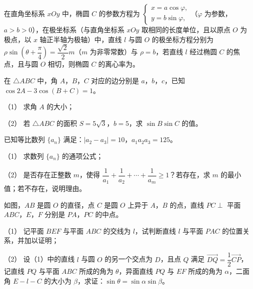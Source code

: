 \begin{question}
在直角坐标系 $xOy$ 中，椭圆 $C$ 的参数方程为 $\begin{cases}x=a\cos\varphi,\\y=b\sin\varphi,\end{cases}$（$\varphi$ 为参数，$a>b>0$），在极坐标系（与直角坐标系 $xOy$ 取相同的长度单位，且以原点 $O$ 为极点，以 $x$ 轴正半轴为极轴）中，直线 $l$ 与圆 $O$ 的极坐标方程分别为 $\rho\sin\left(\theta+\dfrac{\pi}{4}\right)=\dfrac{\sqrt2}{2}m$（$m$ 为非零常数）与 $\rho=b$，若直线 $l$ 经过椭圆 $C$ 的焦点，且与圆 $O$ 相切，则椭圆 $C$ 的离心率为\gkblank{}。

\end{question}

\begin{question}
在 $\triangle ABC$ 中，角 $A$，$B$，$C$ 对应的边分别是 $a$，$b$，$c$，已知 $\cos2A-3\cos(B+C)=1$。

（1） 求角 $A$ 的大小；

（2） 若 $\triangle ABC$ 的面积 $S=5\sqrt3$，$b=5$，求 $\sin B\sin C$ 的值。

\end{question}
\begin{question}
已知等比数列 $\{a_n\}$ 满足：$|a_2-a_3|=10$，$a_1a_2a_3=125$。

（1） 求数列 $\{a_n\}$ 的通项公式；

（2） 是否存在正整数 $m$，使得 $\dfrac{1}{a_1}+\dfrac{1}{a_2}+\cdots+\dfrac{1}{a_m}\geqslant1$？若存在，求 $m$ 的最小值；若不存在，说明理由。

\Needspace{0.4\textheight}
\end{question}
\begin{question}
如图，$AB$ 是圆 $O$ 的直径，点 $C$ 是圆 $O$ 上异于 $A$，$B$ 的点，直线 $PC\perp$ 平面 $ABC$，$E$，$F$ 分别是 $PA$，$PC$ 的中点。

（1） 记平面 $BEF$ 与平面 $ABC$ 的交线为 $l$，试判断直线 $l$ 与平面 $PAC$ 的位置关系，并加以证明；

（2） 设（1）中的直线 $l$ 与圆 $O$ 的另一个交点为 $D$，且点 $Q$ 满足 $\overrightarrow{DQ}=\dfrac12\overrightarrow{CP}$，记直线 $PQ$ 与平面 $ABC$ 所成的角为 $\theta$，异面直线 $PQ$ 与 $EF$ 所成的角为 $\alpha$，二面角 $E-l-C$ 的大小为 $\beta$，求证：$\sin\theta=\sin\alpha\sin\beta$。
\nopagebreak[4]
\begin{center}\end{center}
\nopagebreak[4]
\end{question}
